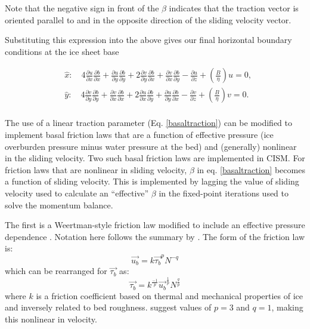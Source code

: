 Note that the negative sign in front of the $\beta$ indicates that the traction vector is oriented parallel to and in the opposite direction of the sliding velocity vector.

Substituting this expression into the above gives our final horizontal boundary conditions at the ice sheet base

\begin{equation}
\begin{split}
  & \hat{x}:\quad 4\frac{\partial u}{\partial x}\frac{\partial b}{\partial x}+\frac{\partial u}{\partial y}\frac{\partial b}{\partial y}+2\frac{\partial v}{\partial y}\frac{\partial b}{\partial x}+\frac{\partial v}{\partial x}\frac{\partial b}{\partial y}-\frac{\partial u}{\partial z}+\left( \frac{B}{\eta } \right)u=0, \\ 
 & \hat{y}:\quad 4\frac{\partial v}{\partial y}\frac{\partial b}{\partial y}+\frac{\partial v}{\partial x}\frac{\partial b}{\partial x}+2\frac{\partial u}{\partial x}\frac{\partial b}{\partial y}+\frac{\partial u}{\partial y}\frac{\partial b}{\partial x}-\frac{\partial v}{\partial z}+\left( \frac{B}{\eta } \right)v=0. \\
\end{split}
 \end{equation}

The use of a linear traction parameter (Eq. \ref{basaltraction}) can be modified to
implement basal friction laws that are a function of effective pressure 
(ice overburden pressure minus water pressure at the bed) and 
(generally) nonlinear in the sliding velocity.  Two such basal friction laws are
implemented in CISM.  For friction laws that are nonlinear in sliding velocity,
$\beta$ in eq. \ref{basaltraction} becomes a function of sliding velocity.  This is
implemented by lagging the value of sliding velocity used to calculate an ``effective'' 
$\beta$ in the fixed-point iterations used to solve the momentum balance.

The first is a Weertman-style friction law \citep{Weertman1957, Weertman1964} modified 
to include an effective pressure dependence \citep{Bindschadler1983, Budd1979}.
Notation here follows the summary by \citet[][p.240, eq.7.17]{Cuffey2010}.  The form of
the friction law is:
\begin{equation}
  \label{weertmansliding}
  \vec{u_b} = k \vec{\tau_{b}}^p N^{-q}
\end{equation}
which can be rearranged for $\vec{\tau_b}$ as:
\begin{equation}
  \label{weertmansliding2}
  \vec{\tau_b} = k^\frac{-1}{p} \vec{u_b}^\frac{1}{p} N^\frac{q}{p}
\end{equation}
where $k$ is a friction coefficient based on thermal and mechanical properties of ice 
and inversely related to bed roughness.  \citet{Cuffey2010} suggest values of 
$p=3$ and $q=1$, making this nonlinear in velocity.  

